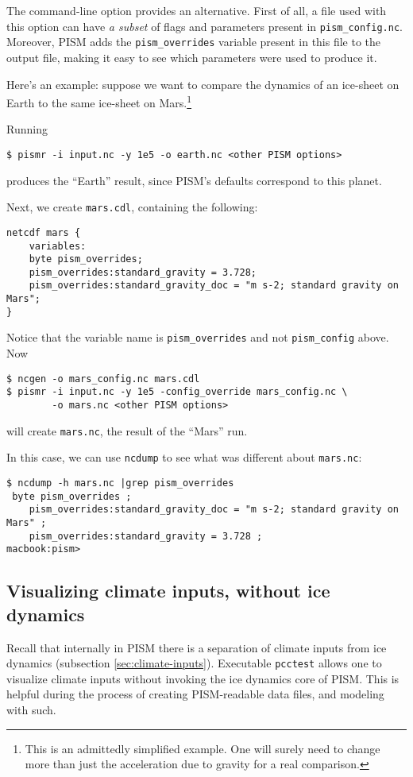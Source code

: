 The  command-line option provides an alternative. First of all, a file used with this option can have \emph{a subset} of flags and parameters present in \verb|pism_config.nc|. Moreover, PISM adds the \verb|pism_overrides| variable present in this file to the output file, making it easy to see which parameters were used to produce it.

Here's an example: suppose we want to compare the dynamics of an ice-sheet on Earth to the same ice-sheet on Mars.\footnote{This is an admittedly simplified example. One will surely need to change more than just the acceleration due to gravity for a real comparison.}

Running
\begin{verbatim}
$ pismr -i input.nc -y 1e5 -o earth.nc <other PISM options>
\end{verbatim}
produces the ``Earth'' result, since PISM's defaults correspond to this planet.

Next, we create \verb|mars.cdl|, containing the following:
\small
\begin{verbatim}
netcdf mars {
    variables:
    byte pism_overrides;
    pism_overrides:standard_gravity = 3.728;
    pism_overrides:standard_gravity_doc = "m s-2; standard gravity on Mars";
}
\end{verbatim}
\normalsize
Notice that the variable name is \verb|pism_overrides| and not \verb|pism_config| above. Now
\begin{verbatim}
$ ncgen -o mars_config.nc mars.cdl
$ pismr -i input.nc -y 1e5 -config_override mars_config.nc \
        -o mars.nc <other PISM options>
\end{verbatim}
will create \verb|mars.nc|, the result of the ``Mars'' run.

In this case, we can use \verb|ncdump| to see what was different about \verb|mars.nc|:
\small
\begin{verbatim}
$ ncdump -h mars.nc |grep pism_overrides
 byte pism_overrides ;
    pism_overrides:standard_gravity_doc = "m s-2; standard gravity on Mars" ;
    pism_overrides:standard_gravity = 3.728 ;
macbook:pism>
\end{verbatim}
\normalsize


\subsection{Visualizing climate inputs, without ice dynamics}\label{subsect:pcctest}  Recall that
internally in PISM there is a separation of climate inputs from ice dynamics
(subsection \ref{sec:climate-inputs}).  Executable \verb|pcctest|
allows one to visualize climate inputs without invoking the ice dynamics core of PISM.
This is helpful during the process of creating PISM-readable data files, and modeling 
with such.

